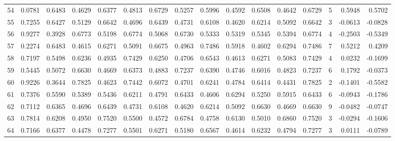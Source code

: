 \begin{tabular}{lrrrrrrrrrrrrrrr}
54  &      0.0781 &  0.6483 &  0.4629 &  0.6377 &  0.4813 &  0.6729 &  0.5257 &  0.5996 &  0.4592 &  0.6508 &   0.4642 &     0.6729 &      5 &                    0.5948 &                     0.5702 \\
55  &      0.7255 &  0.6427 &  0.5129 &  0.6642 &  0.4696 &  0.6439 &  0.4731 &  0.6108 &  0.4620 &  0.6214 &   0.5092 &     0.6642 &      3 &                   -0.0613 &                    -0.0828 \\
56  &      0.9277 &  0.3928 &  0.6773 &  0.5198 &  0.6774 &  0.5068 &  0.6730 &  0.5333 &  0.5319 &  0.5345 &   0.5394 &     0.6774 &      4 &                   -0.2503 &                    -0.5349 \\
57  &      0.2274 &  0.6483 &  0.4615 &  0.6271 &  0.5091 &  0.6675 &  0.4963 &  0.7486 &  0.5918 &  0.4602 &   0.6294 &     0.7486 &      7 &                    0.5212 &                     0.4209 \\
58  &      0.7197 &  0.5498 &  0.6236 &  0.4935 &  0.7429 &  0.6250 &  0.4706 &  0.6543 &  0.4613 &  0.6271 &   0.5083 &     0.7429 &      4 &                    0.0232 &                    -0.1699 \\
59  &      0.5445 &  0.5072 &  0.6630 &  0.4669 &  0.6373 &  0.4883 &  0.7237 &  0.6390 &  0.4746 &  0.6016 &   0.4823 &     0.7237 &      6 &                    0.1792 &                    -0.0373 \\
60  &      0.9226 &  0.3644 &  0.7825 &  0.4623 &  0.7442 &  0.6072 &  0.4701 &  0.6241 &  0.4784 &  0.6414 &   0.4431 &     0.7825 &      2 &                   -0.1401 &                    -0.5582 \\
61  &      0.7376 &  0.5590 &  0.5389 &  0.5436 &  0.6211 &  0.4791 &  0.6433 &  0.4606 &  0.6294 &  0.5250 &   0.5915 &     0.6433 &      6 &                   -0.0943 &                    -0.1786 \\
62  &      0.7112 &  0.6365 &  0.4696 &  0.6439 &  0.4731 &  0.6108 &  0.4620 &  0.6214 &  0.5092 &  0.6630 &   0.4669 &     0.6630 &      9 &                   -0.0482 &                    -0.0747 \\
63  &      0.7814 &  0.6208 &  0.4950 &  0.7520 &  0.5500 &  0.4572 &  0.6784 &  0.4758 &  0.6130 &  0.5010 &   0.6860 &     0.7520 &      3 &                   -0.0294 &                    -0.1606 \\
64  &      0.7166 &  0.6377 &  0.4478 &  0.7277 &  0.5501 &  0.6271 &  0.5180 &  0.6567 &  0.4614 &  0.6232 &   0.4794 &     0.7277 &      3 &                    0.0111 &                    -0.0789 \\

\end{tabular}
